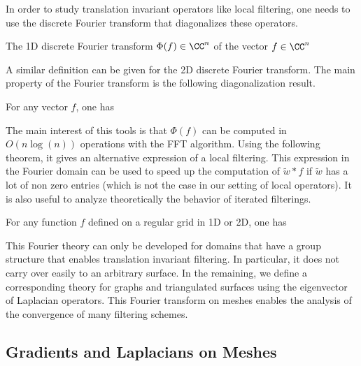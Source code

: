 In order to study translation invariant operators like local filtering, one needs to use the discrete Fourier transform that diagonalizes these operators.

\begin{defn} The 1D discrete Fourier transform $\Phi(f) \in \CC^n$ of the vector $f \in \CC^n$
\end{defn}

A similar definition can be given for the 2D discrete Fourier transform. The main property of the Fourier transform is the following diagonalization result.

\begin{thm} For any vector $f$, one has 
\end{thm}

The main interest of this tools is that $\Phi(f)$ can be computed in $O(n \log(n))$ operations with the FFT algorithm. Using the following theorem, it gives an alternative expression of a local filtering. This expression in the Fourier domain can be used to speed up the computation of $\tilde w * f$ if $\tilde w$ has a lot of non zero entries (which is not the case in our setting of local operators). It is also useful to analyze theoretically the behavior of iterated filterings.

\begin{thm}[Convergence] For any function $f$ defined on a regular grid in 1D or 2D, one has
\end{thm}

This Fourier theory can only be developed for domains that have a group structure that enables translation invariant filtering. In particular, it does not carry over easily to an arbitrary surface. In the remaining, we define a corresponding theory for graphs and triangulated surfaces using the eigenvector of Laplacian operators. This Fourier transform on meshes enables the analysis of the convergence of many filtering schemes. 


\subsection{Gradients and Laplacians on Meshes}
\label{sec-grad-lapl-meshes}

